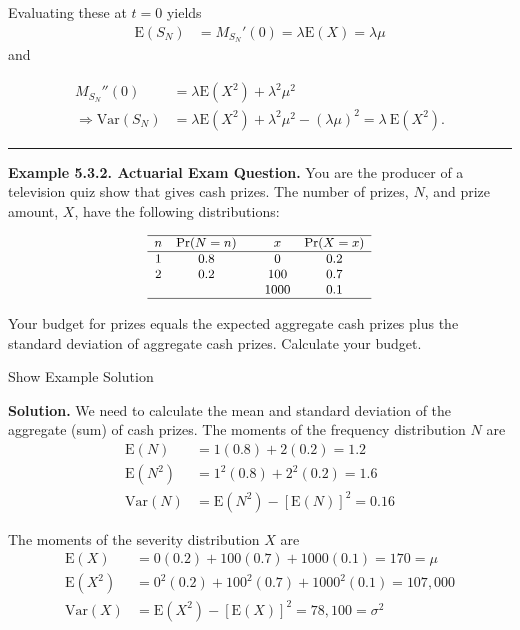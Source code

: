 \documentclass[]{book}
\theoremstyle{definition}
\theoremstyle{definition}
\theoremstyle{definition}
\theoremstyle{remark}
\begin{document}
Evaluating these at \(t=0\) yields \[\begin{aligned}
\mathrm{E}(S_N) &= M_{S_N}'(0) =  \lambda \mathrm{E}(X) = \lambda \mu
\end{aligned}\] and

\[\begin{aligned} M_{S_N}''(0) &= \lambda \mathrm{E}(X^2) + \lambda^2 \mu^2\\
\Rightarrow \mathrm{Var}(S_N) &= \lambda \mathrm{E}(X^2) + \lambda^2 \mu^2 - (\lambda \mu)^2 = \lambda~ \mathrm{E}(X^2).
\end{aligned}\]

\begin{center}\rule{0.5\linewidth}{\linethickness}\end{center}

\textbf{Example 5.3.2. Actuarial Exam Question.} You are the producer of
a television quiz show that gives cash prizes. The number of prizes,
\(N\), and prize amount, \(X\), have the following distributions:

\[
{\small 
\begin{matrix}
\begin{array}{ccccc}\hline
    n & \Pr(N=n) & & x & \Pr(X=x)\\ \hline
    1 & 0.8 & & 0 & 0.2 \\
    2 & 0.2 & & 100 & 0.7 \\
       &       & & 1000 & 0.1\\\hline
  \end{array}
\end{matrix}
}
\]

Your budget for prizes equals the expected aggregate cash prizes plus
the standard deviation of aggregate cash prizes. Calculate your budget.

Show Example Solution

\hypertarget{toggleExampleAggLoss.3.2}{}
\textbf{Solution.} We need to calculate the mean and standard deviation
of the aggregate (sum) of cash prizes. The moments of the frequency
distribution \(N\) are \[\begin{aligned}
\mathrm{E}(N) &= 1 (0.8) + 2 (0.2) =1.2\\
\mathrm{E}(N^2) &=  1^2 (0.8) + 2^2 (0.2) =1.6\\
\mathrm{Var}(N) &= \mathrm{E}(N^2) - \left[ \mathrm{E}(N) \right]^2= 0.16
\end{aligned}\]

The moments of the severity distribution \(X\) are \[\begin{aligned}
\mathrm{E}(X) &= 0 (0.2) + 100 (0.7) + 1000 (0.1) = 170 = \mu\\
\mathrm{E}(X^2) &= 0^2 (0.2) + 100^2 (0.7) + 1000^2 (0.1) = 107,000\\
\mathrm{Var}(X) &= \mathrm{E}(X^2) - \left[ \mathrm{E}(X) \right]^2=78,100 = \sigma^2
\end{aligned}\]
\end{document}
